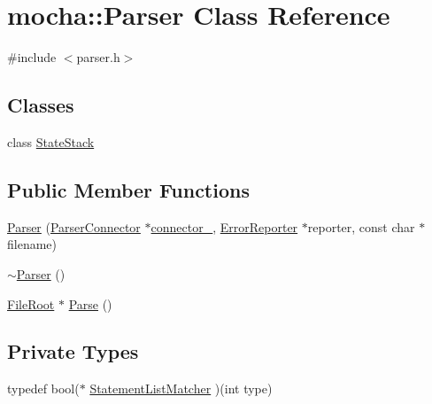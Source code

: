 \hypertarget{classmocha_1_1_parser}{
\section{mocha::Parser Class Reference}
\label{classmocha_1_1_parser}
}


{\ttfamily \#include $<$parser.h$>$}

\subsection*{Classes}
\begin{DoxyCompactItemize}
\item 
class \hyperlink{classmocha_1_1_parser_1_1_state_stack}{StateStack}
\end{DoxyCompactItemize}
\subsection*{Public Member Functions}
\begin{DoxyCompactItemize}
\item 
\hyperlink{classmocha_1_1_parser_a08a4b15209b1ba37b676e9dbcaffafa6}{Parser} (\hyperlink{classmocha_1_1_parser_connector}{ParserConnector} $\ast$\hyperlink{classmocha_1_1_parser_ad90310da001b04cef5b5a82faf54011f}{connector\_\-}, \hyperlink{classmocha_1_1_error_reporter}{ErrorReporter} $\ast$reporter, const char $\ast$filename)
\item 
\hyperlink{classmocha_1_1_parser_ab246b630dcf304fd7346387b14cc8a29}{$\sim$Parser} ()
\item 
\hyperlink{classmocha_1_1_file_root}{FileRoot} $\ast$ \hyperlink{classmocha_1_1_parser_a35ebf00b020104d313bc3f2118166f7c}{Parse} ()
\end{DoxyCompactItemize}
\subsection*{Private Types}
\begin{DoxyCompactItemize}
\item 
typedef bool($\ast$ \hyperlink{classmocha_1_1_parser_aa1eb16ae11106052906d8e5b964daf28}{StatementListMatcher} )(int type)
\end{DoxyCompactItemize}
